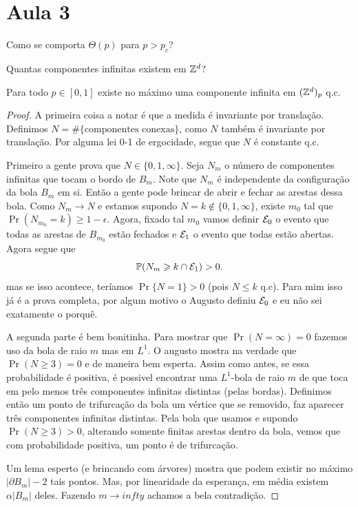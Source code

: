 \section{Aula 3}

\begin{question}
	Como se comporta $\Theta(p)$ para $p > p_c$?
\end{question}

\begin{question}
	Quantas componentes infinitas existem em $\mathbb{Z}^d$?
\end{question}

\begin{theorem}
	Para todo $p \in [0,1]$ existe no máximo uma componente infinita em
	$(\mathbb{Z}^d)_p$ q.c.
\end{theorem}

\begin{proof}
	A primeira coisa a notar é que a medida é invariante por translação. Definimos
	$N = \#\{\text{componentes conexas}\}$, como $N$ também é invariante
	por translação. Por alguma
	lei 0-1 de ergocidade, segue que $N$ é constante q.c.

	Primeiro a gente prova que $N \in \{0,1,\infty\}$. Seja $N_m$ o
	número de componentes
	infinitas que tocam o bordo de $B_m$. Note que $N_m$ é independente
	da configuração da bola $B_m$ em si.
	Então a gente pode brincar de abrir e fechar as arestas dessa bola.
	Como $N_m \to N$ e estamos supondo $N = k \not \in \{0,1,\infty\}$,
	existe $m_0$ tal que
	$\Pr(N_{m_0} = k) \geq 1 - \epsilon$. Agora, fixado tal $m_0$ vamos
	definir $\mathcal{E}_0$ o evento
	que todas as arestas de $B_{m_0}$ estão fechados e $\mathcal{E}_1$ o evento
	que todas estão abertas.
	Agora segue que
	$$\mathbb{P}(N_m \geqslant k \cap \mathcal{E}_1) > 0.$$
	mas se isso acontece, teríamos $\Pr\{N = 1\}>0$ (pois $N \leq k$ q.c).
	Para mim isso já é a prova completa, por algum motivo o Augusto
	definiu $\mathcal{E}_0$ e eu não sei exatamente o
	porquê.

	A segunda parte é bem bonitinha. Para mostrar que $\Pr(N = \infty) =
	0$ fazemos uso da bola de raio $m$ mas
	em $L^1$. O augusto mostra na verdade que $\Pr(N \geq 3) = 0$ e de
	maneira bem esperta. Assim como antes,
	se essa probabilidade é positiva, é possivel encontrar uma
	$L^1$-bola de raio $m$ de que
	toca em pelo menos três componentes infinitas distintas (pelas
	bordas). Definimos então um ponto de trifurcação da bola
	um vértice que se removido, faz aparecer três componentes infinitas
	distintas. Pela bola que usamos e supondo
	$\Pr(N \geq 3) > 0$, alterando somente finitas arestas dentro da
	bola, vemos que com probabilidade positiva, um ponto é de trifurcação.

	Um lema esperto (e brincando com árvores) mostra que podem existir
	no máximo $|\partial B_m| - 2$ tais pontos. Mas,
	por linearidade da esperança, em média existem $\alpha|B_m|$ deles.
	Fazendo $m \to infty$ achamos a bela contradição.
\end{proof}

